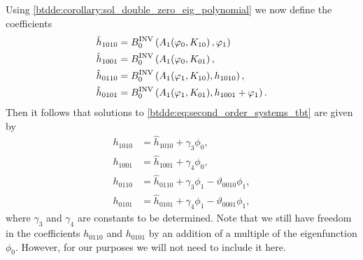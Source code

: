 Using \cref{btdde:corollary:sol_double_zero_eig_polynomial} we now define the coefficients
\begin{align}
    \hat h_{1010} & = B^{\mathrm{INV}}_{0} \left(A_1(\varphi_0,K_{10}\right),\varphi_1)\\
    \hat h_{1001} & = B^{\mathrm{INV}}_{0} \left(A_1(\varphi_0,K_{01}\right),\\
    \hat h_{0110} & = B^{\mathrm{INV}}_{0} \left(A_1(\varphi_1,K_{10}),h_{1010}\right),\\
    \hat h_{0101} & = B^{\mathrm{INV}}_{0} \left(A_1(\varphi_1,K_{01}),h_{1001} + \varphi_1\right).
\end{align}
Then it follows that solutions to \cref{btdde:eq:second_order_systems_tbt} are given by
\begin{equation}
\label{btdde:eq:seconder_order_coefficients_phase_space_tbt}
\begin{aligned}
    h_{1010} &= \hat h_{1010} + \gamma_3 \phi_0, \\
    h_{1001} &= \hat h_{1001} + \gamma_4 \phi_0, \\
    h_{0110} &= \hat h_{0110} + \gamma_3 \phi_1 - \vartheta_{0010} \phi_1, \\
    h_{0101} &= \hat h_{0101} + \gamma_4 \phi_1 - \vartheta_{0001} \phi_1,
\end{aligned}
\end{equation}
where $\gamma_3$ and $\gamma_4$ are constants to be determined. Note that we
still have freedom in the coefficients $h_{0110}$ and $h_{0101}$ by an addition of
a multiple of the eigenfunction $\phi_0$. However, for our purposes we will 
not need to include it here.

